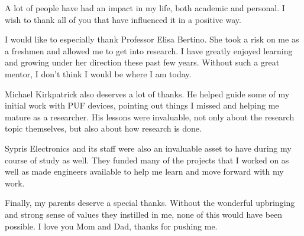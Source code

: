 %
%
%
%
%



\begin{acknowledgments}
A lot of people have had an impact in my life, both academic and personal. I wish to thank all of you 
that have influenced it in a positive way.

I would like to especially thank Professor Elisa Bertino. She took a risk on me as a freshmen and allowed 
me to get into research. I have greatly enjoyed learning and growing under her direction these past few 
years. Without such a great mentor, I don't think I would be where I am today.

Michael Kirkpatrick also deserves a lot of thanks. He helped guide some of my initial work with PUF devices,
pointing out things I missed and helping me mature as a researcher. His lessons were invaluable, not
only about the research topic themselves, but also about how research is done.

Sypris Electronics and its staff were also an invaluable asset to have during my course of study as well. They
funded many of the projects that I worked on as well as made engineers available to help me learn and move
forward with my work.

Finally, my parents deserve a special thanks. Without the wonderful upbringing and strong sense of values 
they instilled in me, none of this would have been possible. I love you Mom and Dad, thanks for pushing
me.

\end{acknowledgments}

